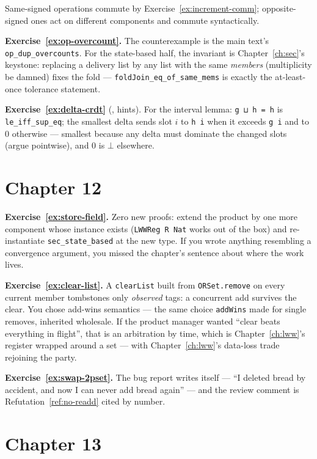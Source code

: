 \documentclass[12pt, a4paper, openright]{book}
\theoremstyle{thmstyle}
\theoremstyle{defstyle}
\newcommand{\lc}[1]{\texttt{#1}}
\begin{document}
Same-signed operations commute by
Exercise~\ref{ex:increment-comm}; opposite-signed ones act on
different components and commute syntactically.

\textbf{Exercise~\ref{ex:op-overcount}.} The counterexample is the main
text's \lc{op_dup_overcounts}. For the state-based half, the invariant
is Chapter~\ref{ch:sec}'s keystone: replacing a delivery list by any
list with the same \emph{members} (multiplicity be damned) fixes the
fold --- \lc{foldJoin_eq_of_same_mems} is exactly the at-least-once
tolerance statement.

\textbf{Exercise~\ref{ex:delta-crdt}} (,
hints). For the interval lemma: \lc{g ⊔ h = h} is
\lc{le_iff_sup_eq}; the smallest delta sends slot $i$ to \lc{h i} when
it exceeds \lc{g i} and to $0$ otherwise --- smallest because any delta
must dominate the changed slots (argue pointwise), and $0$ is $\bot$
elsewhere.

\section*{Chapter 12}

\textbf{Exercise~\ref{ex:store-field}.} Zero new proofs: extend the
product by one more component whose instance exists
(\lc{LWWReg R Nat} works out of the box) and re-instantiate
\lc{sec_state_based} at the new type. If you wrote anything resembling a
convergence argument, you missed the chapter's sentence about where the
work lives.

\textbf{Exercise~\ref{ex:clear-list}.} A \lc{clearList} built from
\lc{ORSet.remove} on every current member tombstones only \emph{observed}
tags: a concurrent add survives the clear. You chose add-wins semantics
--- the same choice \lc{addWins} made for single removes, inherited
wholesale. If the product manager wanted ``clear beats everything in
flight'', that is an arbitration by time, which is
Chapter~\ref{ch:lww}'s register wrapped around a set --- with
Chapter~\ref{ch:lww}'s data-loss trade rejoining the party.

\textbf{Exercise~\ref{ex:swap-2pset}.} The bug report writes itself
--- ``I deleted bread by accident, and now I can never add bread
again'' --- and the review comment is
Refutation~\ref{ref:no-readd} cited by number.

\section*{Chapter 13}
\end{document}
